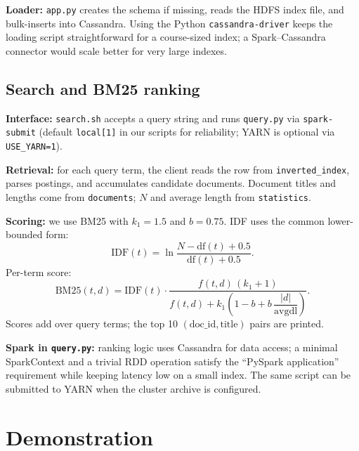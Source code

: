 \documentclass[11pt,a4paper]{article}
\begin{document}
\textbf{Loader:} \texttt{app.py} creates the schema if missing, reads the HDFS index file, and bulk-inserts into Cassandra. Using the Python \texttt{cassandra-driver} keeps the loading script straightforward for a course-sized index; a Spark--Cassandra connector would scale better for very large indexes.

\subsection{Search and BM25 ranking}
\textbf{Interface:} \texttt{search.sh} accepts a query string and runs \texttt{query.py} via \texttt{spark-submit} (default \texttt{local[1]} in our scripts for reliability; YARN is optional via \texttt{USE\_YARN=1}).

\textbf{Retrieval:} for each query term, the client reads the row from \texttt{inverted\_index}, parses postings, and accumulates candidate documents. Document titles and lengths come from \texttt{documents}; $N$ and average length from \texttt{statistics}.

\textbf{Scoring:} we use BM25 with $k_1=1.5$ and $b=0.75$. IDF uses the common lower-bounded form:
\begin{equation}
\mathrm{IDF}(t) = \ln\frac{N - \mathrm{df}(t) + 0.5}{\mathrm{df}(t) + 0.5}.
\end{equation}
Per-term score:
\begin{equation}
\mathrm{BM25}(t,d) = \mathrm{IDF}(t)\cdot
\frac{f(t,d)\,(k_1+1)}{f(t,d) + k_1\left(1 - b + b\,\dfrac{|d|}{\mathrm{avgdl}}\right)}.
\end{equation}
Scores add over query terms; the top 10 $(\mathrm{doc\_id}, \mathrm{title})$ pairs are printed.

\textbf{Spark in \texttt{query.py}:} ranking logic uses Cassandra for data access; a minimal SparkContext and a trivial RDD operation satisfy the ``PySpark application'' requirement while keeping latency low on a small index. The same script can be submitted to YARN when the cluster archive is configured.

\section{Demonstration}
\end{document}
